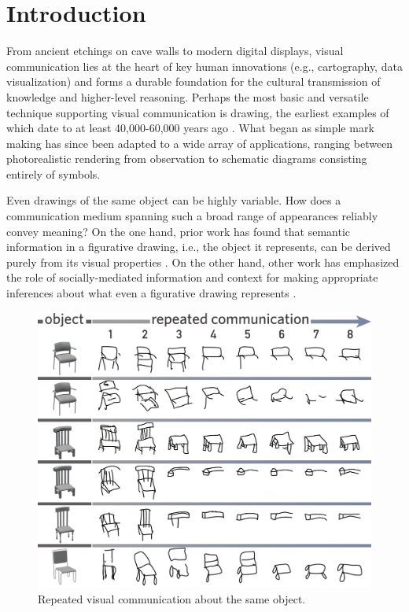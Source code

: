 \documentclass[10pt,letterpaper]{article}
\begin{document}
\section{Introduction}

From ancient etchings on cave walls to modern digital displays, visual communication lies at the heart of key human innovations (e.g., cartography, data visualization) and forms a durable foundation for the cultural transmission of knowledge and higher-level reasoning.
Perhaps the most basic and versatile technique supporting visual communication is drawing, the earliest examples of which date to at least 40,000-60,000 years ago \cite{hoffmann2018u}.
What began as simple mark making has since been adapted to a wide array of applications, ranging between photorealistic rendering from observation to schematic diagrams consisting entirely of symbols.

Even drawings of the same object can be highly variable.
How does a communication medium spanning such a broad range of appearances reliably convey meaning?
On the one hand, prior work has found that semantic information in a figurative drawing, i.e., the object it represents, can be derived purely from its visual properties \cite{FanCommon2018}.
On the other hand, other work has emphasized the role of socially-mediated information and context for making appropriate inferences about what even a figurative drawing represents \cite{goodman1976languages}.

\begin{figure}
\includegraphics[width=0.99\linewidth]{figures/sketch_gallery.pdf}
\caption{Repeated visual communication about the same object.}
\label{sketch_gallery}
\end{figure}
\end{document}
